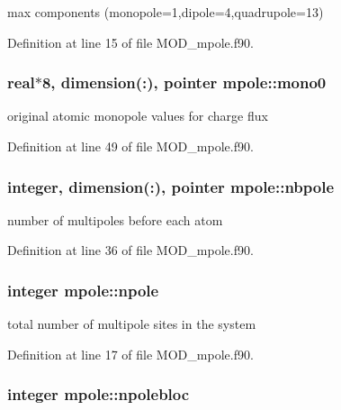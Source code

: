 max components (monopole=1,dipole=4,quadrupole=13) 



Definition at line 15 of file M\-O\-D\-\_\-mpole.\-f90.

\hypertarget{classmpole_a7931c73e67f6769c759412d25e58fc58}{
\subsubsection[{mono0}]{\setlength{\rightskip}{0pt plus 5cm}real$\ast$8, dimension(\-:), pointer mpole\-::mono0}}\label{classmpole_a7931c73e67f6769c759412d25e58fc58}


original atomic monopole values for charge flux 



Definition at line 49 of file M\-O\-D\-\_\-mpole.\-f90.

\hypertarget{classmpole_a34c84581392243bd5d97966a6354d030}{
\subsubsection[{nbpole}]{\setlength{\rightskip}{0pt plus 5cm}integer, dimension(\-:), pointer mpole\-::nbpole}}\label{classmpole_a34c84581392243bd5d97966a6354d030}


number of multipoles before each atom 



Definition at line 36 of file M\-O\-D\-\_\-mpole.\-f90.

\hypertarget{classmpole_a1fb8ee54aa5e7d374e2ed5115ed2c1fe}{
\subsubsection[{npole}]{\setlength{\rightskip}{0pt plus 5cm}integer mpole\-::npole}}\label{classmpole_a1fb8ee54aa5e7d374e2ed5115ed2c1fe}


total number of multipole sites in the system 



Definition at line 17 of file M\-O\-D\-\_\-mpole.\-f90.

\hypertarget{classmpole_ade12dc4b50a1b89aa7b9010a9e553e44}{
\subsubsection[{npolebloc}]{\setlength{\rightskip}{0pt plus 5cm}integer mpole\-::npolebloc}}\label{classmpole_ade12dc4b50a1b89aa7b9010a9e553e44}



